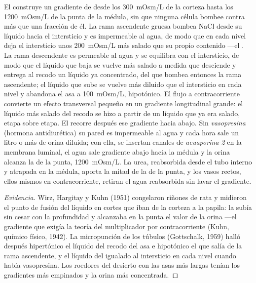 \begin{proposition}\label{prop:b3:renal-osmoregulation:countercurrent}
El  construye un gradiente de  desde los
\qty{300}{mOsm/L} de la corteza hasta los \qty{1200}{mOsm/L} de la
punta de la médula, sin que ninguna célula bombee contra más que una
fracción de él. La rama ascendente gruesa bombea NaCl desde su líquido
hacia el intersticio y es impermeable al agua, de modo que en cada
nivel deja el intersticio unos \qty{200}{mOsm/L} más salado que su
propio contenido ---el \emph{}. La rama descendente es
permeable al agua y se equilibra con el intersticio, de modo que el
líquido que baja se vuelve más salado a medida que desciende y entrega
al recodo un líquido ya concentrado, del que bombea entonces la rama
ascendente; el líquido que sube se vuelve más diluido que el
intersticio en cada nivel y abandona el asa a \qty{100}{mOsm/L},
hipotónico. El flujo a contracorriente convierte un efecto transversal
pequeño en un gradiente longitudinal grande: el líquido más salado del
recodo se hizo a partir de un líquido que ya era salado, etapa sobre
etapa. El  recorre después ese gradiente hacia abajo. Sin
\emph{vasopresina} (hormona antidiurética) su pared es impermeable al
agua y cada hora sale un litro o más de orina diluida; con ella, se
insertan canales de \emph{acuaporina-2} en la membrana luminal, el agua
sale gradiente abajo hacia la médula y la orina alcanza la 
de la punta, \qty{1200}{mOsm/L}. La urea, reabsorbida desde el tubo
interno y atrapada en la médula, aporta la mitad de la  de
la punta, y los vasos rectos, ellos mismos en contracorriente, retiran
el agua reabsorbida sin lavar el gradiente.
\end{proposition}

\begin{proof}[Evidencia]
Wirz, Hargitay y Kuhn (1951) congelaron riñones de rata y midieron el
punto de fusión del líquido en cortes que iban de la corteza a la
papila: la  subía sin cesar con la profundidad y alcanzaba
en la punta el valor de la orina ---el gradiente que exigía la teoría
del multiplicador por contracorriente (Kuhn, químico físico, 1942). La
micropunción de los túbulos (Gottschalk, 1959) halló después
hipertónico el líquido del recodo del asa e hipotónico el que salía de
la rama ascendente, y el líquido del  igualado al
intersticio en cada nivel cuando había vasopresina. Los roedores del
desierto con las asas más largas tenían los gradientes más empinados y
la orina más concentrada.
\end{proof}

